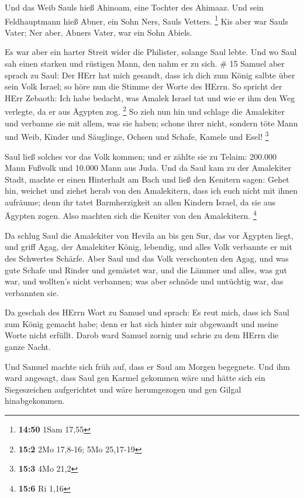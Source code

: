  Und das Weib Sauls hieß Ahinoam, eine Tochter des Ahimaaz.
Und sein Feldhauptmann hieß Abner, ein Sohn Ners, Sauls Vetters.
\footnote{\textbf{14:50} 1Sam 17,55}  Kis aber war Sauls
Vater; Ner aber, Abners Vater, war ein Sohn Abiels.

 Es war aber ein harter Streit wider die Philister, solange
Saul lebte. Und wo Saul sah einen starken und rüstigen Mann, den nahm er
zu sich. \# 15  Samuel aber sprach zu Saul: Der HErr hat
mich gesandt, dass ich dich zum König salbte über sein Volk Israel; so
höre nun die Stimme der Worte des HErrn.  So spricht der
HErr Zebaoth: Ich habe bedacht, was Amalek Israel tat und wie er ihm den
Weg verlegte, da er aus Ägypten zog. \footnote{\textbf{15:2} 2Mo
  17,8-16; 5Mo 25,17-19}  So zieh nun hin und schlage die
Amalekiter und verbanne sie mit allem, was sie haben; schone ihrer
nicht, sondern töte Mann und Weib, Kinder und Säuglinge, Ochsen und
Schafe, Kamele und Esel! \footnote{\textbf{15:3} 4Mo 21,2}

 Saul ließ solches vor das Volk kommen; und er zählte sie zu
Telaim: 200.000 Mann Fußvolk und 10.000 Mann aus Juda.  Und
da Saul kam zu der Amalekiter Stadt, machte er einen Hinterhalt am Bach
 und ließ den Kenitern sagen: Gehet hin, weichet und ziehet
herab von den Amalekitern, dass ich euch nicht mit ihnen aufräume; denn
ihr tatet Barmherzigkeit an allen Kindern Israel, da sie aus Ägypten
zogen. Also machten sich die Keniter von den Amalekitern. \footnote{\textbf{15:6}
  Ri 1,16}

 Da schlug Saul die Amalekiter von Hevila an bis gen Sur,
das vor Ägypten liegt,  und griff Agag, der Amalekiter
König, lebendig, und alles Volk verbannte er mit des Schwertes Schärfe.
 Aber Saul und das Volk verschonten den Agag, und was gute
Schafe und Rinder und gemästet war, und die Lämmer und alles, was gut
war, und wollten's nicht verbannen; was aber schnöde und untüchtig war,
das verbannten sie.

 Da geschah des HErrn Wort zu Samuel und sprach:
 Es reut mich, dass ich Saul zum König gemacht habe; denn
er hat sich hinter mir abgewandt und meine Worte nicht erfüllt. Darob
ward Samuel zornig und schrie zu dem HErrn die ganze Nacht.

 Und Samuel machte sich früh auf, dass er Saul am Morgen
begegnete. Und ihm ward angesagt, dass Saul gen Karmel gekommen wäre und
hätte sich ein Siegeszeichen aufgerichtet und wäre herumgezogen und gen
Gilgal hinabgekommen.

